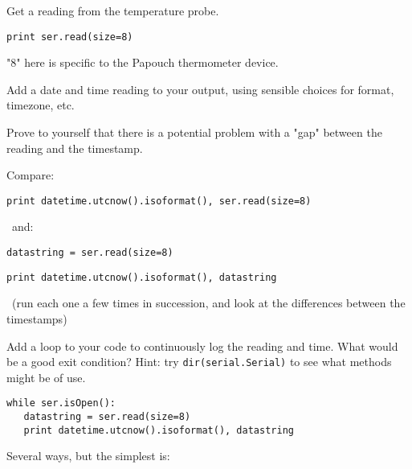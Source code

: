 \documentclass[a4paper,11pt]{article}
\begin{document}
\begin{solution}
\noindent\usebox\serbasic
\end{solution}
\begin{question}
Get a reading from the temperature probe.
\end{question}
\begin{solution}
\texttt{print ser.read(size=8)}
\par
"8" here is specific to the Papouch thermometer device.
\end{solution}
\begin{question}
Add a date and time reading to your output, using sensible choices for 
format, timezone, etc.
\end{question}
\begin{question}
Prove to yourself that there is a potential problem with a "gap" between 
the reading and the timestamp.
\end{question}
\begin{solution}
Compare:

\texttt{print datetime.utcnow().isoformat(), ser.read(size=8)}


\noindent~and:


\texttt{datastring = ser.read(size=8)}\par
\texttt{print datetime.utcnow().isoformat(), datastring}

\noindent~(run each one a few times in succession, and look at the differences between
the timestamps)
\end{solution}
\begin{question}
Add a loop to your code to continuously log the reading and time. What would be a good exit condition? Hint: try \texttt{dir(serial.Serial)} to see what methods 
might be of use.
\end{question}
\newsavebox\serloop
\begin{lrbox}{\serloop}
\begin{minipage}{\textwidth}
\begin{verbatim}
while ser.isOpen():
   datastring = ser.read(size=8)
   print datetime.utcnow().isoformat(), datastring
\end{verbatim}
\end{minipage}
\end{lrbox}

\begin{solution}
Several ways, but the simplest is:

\noindent\usebox\serloop

\end{solution}
\end{document}
